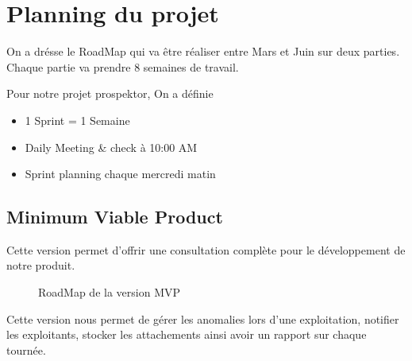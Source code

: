 \section{Planning du projet}
On a dr\'esse le RoadMap qui va \^etre r\'ealiser entre Mars et Juin sur deux parties. Chaque partie va prendre 8 semaines de travail.

Pour notre projet prospektor, On a d\'efinie 
\begin{itemize}
\item 1 Sprint = 1 Semaine
\item Daily Meeting \& check \`a 10:00 AM
\item Sprint planning chaque mercredi matin
\end{itemize}

\subsection{Minimum Viable Product}
Cette version permet d'offrir une consultation compl\`ete pour le d\'eveloppement de notre produit.
\begin{figure}[H]
	\caption{\label{fig:my-label} RoadMap de la version \gls{MVP}}
\end{figure}

Cette version nous permet de g\'erer les anomalies lors d'une exploitation, notifier les exploitants, stocker les attachements ainsi avoir un rapport sur chaque tourn\'ee.
